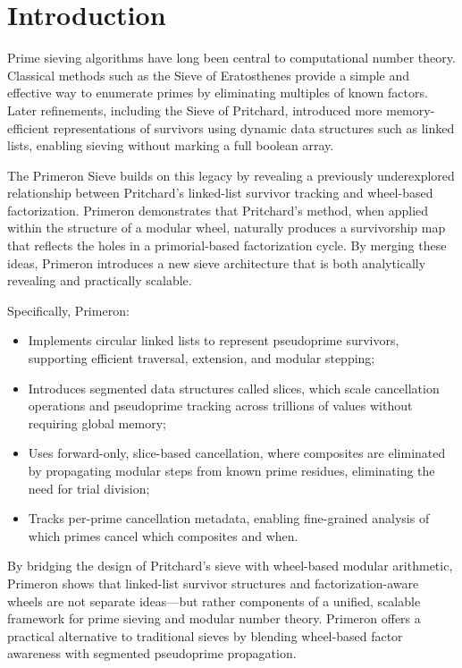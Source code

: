 
\section{Introduction}
Prime sieving algorithms have long been central to computational number theory. Classical methods such as the Sieve of Eratosthenes provide a simple and effective way to enumerate primes by eliminating multiples of known factors. Later refinements, including the Sieve of Pritchard, introduced more memory-efficient representations of survivors using dynamic data structures such as linked lists, enabling sieving without marking a full boolean array.


The Primeron Sieve builds on this legacy by revealing a previously underexplored relationship between Pritchard’s linked-list survivor tracking and wheel-based factorization. Primeron demonstrates that Pritchard’s method, when applied within the structure of a modular wheel, naturally produces a survivorship map that reflects the holes in a primorial-based factorization cycle. By merging these ideas, Primeron introduces a new sieve architecture that is both analytically revealing and practically scalable.

Specifically, Primeron:
\begin{itemize}
  \item Implements circular linked lists to represent pseudoprime survivors, supporting efficient traversal, extension, and modular stepping;
  \item Introduces segmented data structures called slices, which scale cancellation operations and pseudoprime tracking across trillions of values without requiring global memory;
  \item Uses forward-only, slice-based cancellation, where composites are eliminated by propagating modular steps from known prime residues, eliminating the need for trial division;
  \item Tracks per-prime cancellation metadata, enabling fine-grained analysis of which primes cancel which composites and when.
\end{itemize}

By bridging the design of Pritchard’s sieve with wheel-based modular arithmetic, Primeron shows that linked-list survivor structures and factorization-aware wheels are not separate ideas—but rather components of a unified, scalable framework for prime sieving and modular number theory.  Primeron offers a practical alternative to traditional sieves by blending wheel-based factor awareness with segmented pseudoprime propagation.

